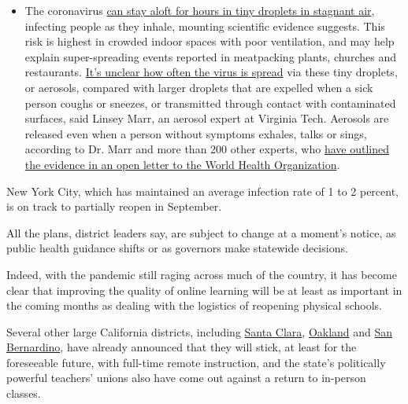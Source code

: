 \begin{itemize}
  \begin{itemize}
  \tightlist
  \item
    The coronavirus
    \href{https://www.nytimes.com/2020/07/04/health/239-experts-with-one-big-claim-the-coronavirus-is-airborne.html?action=click\&pgtype=Article\&state=default\&region=MAIN_CONTENT_3\&context=storylines_faq}{can
    stay aloft for hours in tiny droplets in stagnant air}, infecting
    people as they inhale, mounting scientific evidence suggests. This
    risk is highest in crowded indoor spaces with poor ventilation, and
    may help explain super-spreading events reported in meatpacking
    plants, churches and restaurants.
    \href{https://www.nytimes.com/2020/07/06/health/coronavirus-airborne-aerosols.html?action=click\&pgtype=Article\&state=default\&region=MAIN_CONTENT_3\&context=storylines_faq}{It's
    unclear how often the virus is spread} via these tiny droplets, or
    aerosols, compared with larger droplets that are expelled when a
    sick person coughs or sneezes, or transmitted through contact with
    contaminated surfaces, said Linsey Marr, an aerosol expert at
    Virginia Tech. Aerosols are released even when a person without
    symptoms exhales, talks or sings, according to Dr. Marr and more
    than 200 other experts, who
    \href{https://academic.oup.com/cid/article/doi/10.1093/cid/ciaa939/5867798}{have
    outlined the evidence in an open letter to the World Health
    Organization}.
  \end{itemize}
\end{itemize}

New York City, which has maintained an average infection rate of 1 to 2
percent, is on track to partially reopen in September.

All the plans, district leaders say, are subject to change at a moment's
notice, as public health guidance shifts or as governors make statewide
decisions.

Indeed, with the pandemic still raging across much of the country, it
has become clear that improving the quality of online learning will be
at least as important in the coming months as dealing with the logistics
of reopening physical schools.

Several other large California districts, including
\href{https://www.sfchronicle.com/bayarea/article/Santa-Clara-area-school-district-delays-return-to-15403000.php}{Santa
Clara}, \href{https://www.ousd.org/covid-19updates}{Oakland} and
\href{https://www.sbcusd.com/news/what_s_new/July22020_message_from_interim_superintendent}{San
Bernardino}, have already announced that they will stick, at least for
the foreseeable future, with full-time remote instruction, and the
state's politically powerful teachers' unions also have come out against
a return to in-person classes.

